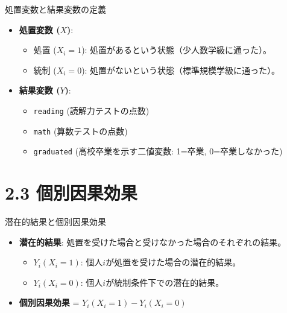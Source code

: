 \documentclass[
  ignorenonframetext,
]{beamer}
\providecommand{\tightlist}{%
  \setlength{\itemsep}{0pt}\setlength{\parskip}{0pt}}
\begin{document}
\begin{frame}[fragile]{処置変数と結果変数の定義}
\protect\hypertarget{ux51e6ux7f6eux5909ux6570ux3068ux7d50ux679cux5909ux6570ux306eux5b9aux7fa9}{}
\begin{itemize}
\tightlist
\item
  \textbf{処置変数 (\(X\))}:

  \begin{itemize}
  \tightlist
  \item
    処置 (\(X_i = 1\)): 処置があるという状態（少人数学級に通った）。
  \item
    統制 (\(X_i = 0\)): 処置がないという状態（標準規模学級に通った）。
  \end{itemize}
\item
  \textbf{結果変数 (\(Y\))}:

  \begin{itemize}
  \tightlist
  \item
    \texttt{reading} (読解力テストの点数)
  \item
    \texttt{math} (算数テストの点数)
  \item
    \texttt{graduated} (高校卒業を示す二値変数: 1=卒業,
    0=卒業しなかった)
  \end{itemize}
\end{itemize}
\end{frame}

\hypertarget{ux500bux5225ux56e0ux679cux52b9ux679c}{%
\section{2.3 個別因果効果}\label{ux500bux5225ux56e0ux679cux52b9ux679c}}

\begin{frame}{潜在的結果と個別因果効果}
\protect\hypertarget{ux6f5cux5728ux7684ux7d50ux679cux3068ux500bux5225ux56e0ux679cux52b9ux679c}{}
\begin{itemize}
\tightlist
\item
  \textbf{潜在的結果}:
  処置を受けた場合と受けなかった場合のそれぞれの結果。

  \begin{itemize}
  \tightlist
  \item
    \(Y_i(X_i = 1)\): 個人\(i\)が処置を受けた場合の潜在的結果。
  \item
    \(Y_i(X_i = 0)\): 個人\(i\)が統制条件下での潜在的結果。
  \end{itemize}
\item
  \textbf{個別因果効果} = \(Y_i(X_i = 1) - Y_i(X_i = 0)\)
\end{itemize}
\end{frame}
\end{document}
